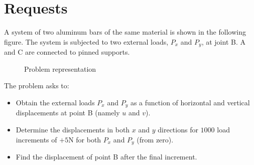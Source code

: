 \section{Requests}
A system of two aluminum bars of the same material is shown in the following figure.
The system is subjected to two external loads, $P_x$ and $P_y$, at joint B.
A and C are connected to pinned supports.

\begin{figure}[h]
    \centering
    \caption{Problem representation}
    \label{fig:problem_representationy}
\end{figure}

The problem asks to:

\begin{itemize}
    \item Obtain the external loads $P_x$ and $P_y$ as a function of horizontal and vertical displacements at point B (namely $u$ and $v$).
    \item Determine the displacements in both $x$ and $y$ directions for $1000$ load increments of $+5\text{N}$ for both $P_x$ and $P_y$ (from zero).
    \item Find the displacement of point B after the final increment.
\end{itemize}

